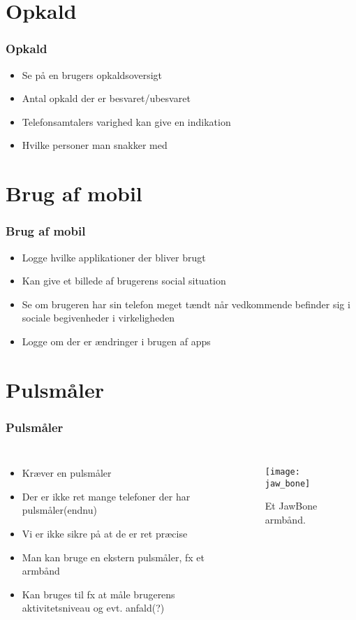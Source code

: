 \section{Opkald}
\begin{frame}
\frametitle{Opkald}
\begin{itemize}
\item Se på en brugers opkaldsoversigt
\item Antal opkald der er besvaret/ubesvaret
\item Telefonsamtalers varighed kan give en indikation
\item Hvilke personer man snakker med
\end{itemize}
\end{frame}



\section{Brug af mobil}
\begin{frame}
\frametitle{Brug af mobil}
\begin{itemize}
\item Logge hvilke applikationer der bliver brugt
\item Kan give et billede af brugerens social situation
\item Se om brugeren har sin telefon meget tændt når vedkommende befinder sig i sociale begivenheder i virkeligheden
\item Logge om der er ændringer i brugen af apps
\end{itemize}

\end{frame}



\section{Pulsmåler}
\begin{frame}[fragile]
\frametitle{Pulsmåler}
\begin{columns}
\column[t]{5cm}
\begin{itemize}
\item Kræver en pulsmåler
\item Der er ikke ret mange telefoner der har pulsmåler(endnu)
\item Vi er ikke sikre på at de er ret præcise
\item Man kan bruge en ekstern pulsmåler, fx et armbånd
\item Kan bruges til fx at måle brugerens aktivitetsniveau og evt. anfald(?)
\end{itemize}
\column[t]{5cm}
\begin{figure}
\texttt{[image: jaw\_bone]}
\caption{Et JawBone armbånd.}
\end{figure}
\end{columns}
\end{frame}


